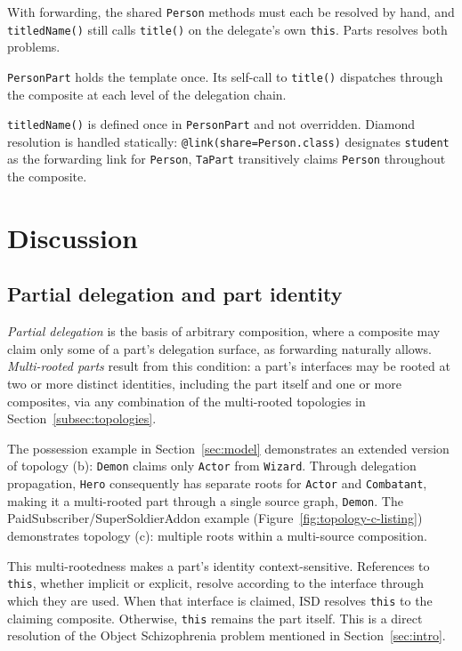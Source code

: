 \documentclass[acmsmall,screen,review,anonymous]{acmart}
\theoremstyle{acmplain}
\newcommand{\code}[1]{\texttt{#1}}
\begin{document}
With forwarding, the shared \code{Person} methods
must each be resolved by hand, and \code{titledName()} still calls
\code{title()} on the delegate's own \code{this}. Parts resolves both problems.

\code{PersonPart} holds the template once. Its self-call to \code{title()}
dispatches through the composite at each level of the delegation chain.

\code{titledName()} is defined once in \code{PersonPart} and not overridden.
Diamond resolution is handled statically: \code{@link(share=Person.class)}
designates \code{student} as the forwarding link for \code{Person}, \code{TaPart}
transitively claims \code{Person} throughout the composite.

\section{Discussion}
\label{sec:discussion}

\subsection{Partial delegation and part identity}
\label{subsec:identity}

\emph{Partial delegation} is the basis of arbitrary composition, where a composite may claim only some of a part's delegation
surface, as forwarding naturally allows. \emph{Multi-rooted parts} result from this condition: a part's interfaces may be
rooted at two or more distinct identities, including the part itself and one or more composites, via any combination of
the multi-rooted topologies in Section~\ref{subsec:topologies}.

The possession example in Section~\ref{sec:model} demonstrates an extended version of topology (b): \code{Demon} claims
only \code{Actor} from \code{Wizard}. Through delegation propagation, \code{Hero} consequently has separate roots for \code{Actor}
and \code{Combatant}, making it a multi-rooted part through a single source graph, \code{Demon}. The PaidSubscriber/SuperSoldierAddon
example (Figure~\ref{fig:topology-c-listing}) demonstrates topology (c): multiple roots within a multi-source composition.

This multi-rootedness makes a part's identity context-sensitive. References to \code{this}, whether implicit or explicit,
resolve according to the interface through which they are used. When that interface is claimed, ISD resolves \code{this}
to the claiming composite. Otherwise, \code{this} remains the part itself. This is a direct resolution of the Object Schizophrenia
problem mentioned in Section~\ref{sec:intro}.
\end{document}
